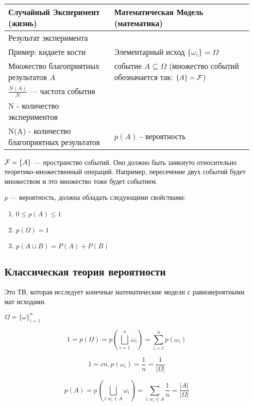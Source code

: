 	\begin{tabular}{p{}|p{}}
			Случайный Эксперимент (жизнь) & Математическая Модель (математика) \\
		\hline
		\hline
		Результат эксперимента\\ Пример: кидаете кости & Элементарный исход $ \{\omega_i\} = \Omega $  \\
		\hline
		Множество благоприятных результатов $A$ & событие $A \subseteq \Omega$ (множество событий обозначается так: $\{A\} = \mathcal{F}$) \\
		\hline
		$\frac{N(A)}{N}$ --- частота события\\ N - количество экспериментов\\ N(A) - количество благоприятных результатов & $p(A)$ - вероятность \\
		\hline
	\end{tabular}

$\mathcal{F} = \{A\}$ --- пространство событий. Оно должно быть замкнуто относительно теоретико-множественный операций. Например, пересечение двух событий будет множеством и это множество тоже будет событием.

$p$ ---  вероятность, должна обладать следующими свойствами:
\begin{enumerate}
		\item $0 \leq p(A) \leq 1$
		\item  $p(\Omega) = 1$
		\item $p(A\sqcup B) = P(A) + P(B)$
\end{enumerate}

\subsection{Классическая теория вероятности}

 Это ТВ, которая исследует конечные математические  модели с равновероятными мат исходами.

$\Omega = \{\omega\}^n_{i=1}$

$$ 1 = p(\Omega) = p(\overset{n}{\underset{i=1}{\bigsqcup}}\omega_i)=\sum^n_{i=1}p(\omega_i) $$

$$ 1 = cn, p(\omega_i) = \frac1n = \frac1{|\Omega|} $$

$$ p(A) = p\left(\underset{i:w_i \in A}{\bigsqcup}\omega_i\right) = \sum_{i: w_i \in A} \frac1n = \frac{|A|}{|\Omega|}$$

